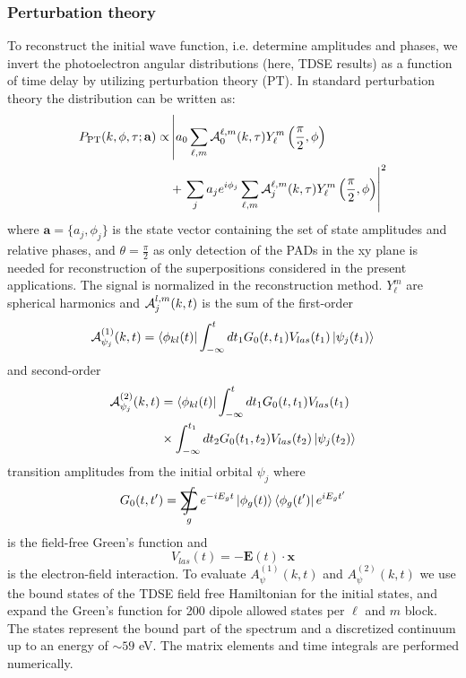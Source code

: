 \subsubsection{Perturbation theory}

To reconstruct the initial wave function, i.e. determine amplitudes and phases, we invert the photoelectron angular distributions (here, TDSE results) as a function of time delay by utilizing perturbation theory (PT). In standard perturbation theory the distribution can be written as:
%
\begin{align}
    P_{\text{PT}}(k,\phi,\tau; \mathbf{a}) \propto& \left|a_0 \sum_{\ell,m} {\cal A}_0^{\ell,m}(k,\tau) Y_\ell^m\left(\frac{\pi}{2},\phi\right) \right.
    \\ 
    & + \left. \sum_j a_j e^{i\phi_j} \sum_{\ell,m} {\cal A}_j^{\ell,m}(k,\tau) Y_\ell^m\left(\frac{\pi}{2},\phi\right)\right|^2
    \nonumber
\end{align}
%
where $\mathbf{a} = \{a_j,\phi_j\}$ is the state vector containing the set of state amplitudes and relative phases, and $\theta=\frac{\pi}{2}$ as only detection of the PADs in the xy plane is needed for reconstruction of the superpositions considered in the present applications. The signal is normalized in the reconstruction method. $Y_\ell^m$ are spherical harmonics
and ${\cal A}_j^{l,m}(k,t)$ is the sum of the first-order
%
\begin{equation}
    {\cal A}_{\psi_j}^{(1)}(k,t) = \bra{\phi_{kl}(t)}\int_{-\infty}^t dt_1 G_0(t,t_1)V_{las}(t_1)\ket{\psi_j(t_1)} 
\end{equation}
%
and second-order
%
\begin{align}
    {\cal A}_{\psi_j}^{(2)}(k,t) &= \bra{\phi_{kl}(t)}\int_{-\infty}^t dt_1 G_0(t,t_1)V_{las}(t_1) 
    \nonumber
    \\
    &\times \int_{-\infty}^{t_1} dt_2 G_0(t_1,t_2)V_{las}(t_2)\ket{\psi_j(t_2)}
\end{align}
%
transition amplitudes from the initial orbital $\psi_j$ where
%
\begin{equation}
    G_0(t,t') = \SumInt_g e^{-iE_g t}\ket{\phi_g(t)}\bra{\phi_g(t')} e^{iE_g t'}
\end{equation}
%
is the field-free Green's function and 
%
\begin{equation}
   V_{las}(t) = - \mathbf{E}(t) \cdot \mathbf{x} 
\end{equation}
%
is the electron-field interaction. To evaluate $A_\psi^{(1)}(k,t)$ and $A_\psi^{(2)}(k,t)$ we use the bound states of the TDSE field free Hamiltonian for the initial states, and expand the Green's function for 200 dipole allowed states per $\ell$ and $m$ block. The states represent the bound part of the spectrum and a discretized continuum up to an energy of $\sim59$ eV.
The matrix elements and time integrals are performed numerically.

